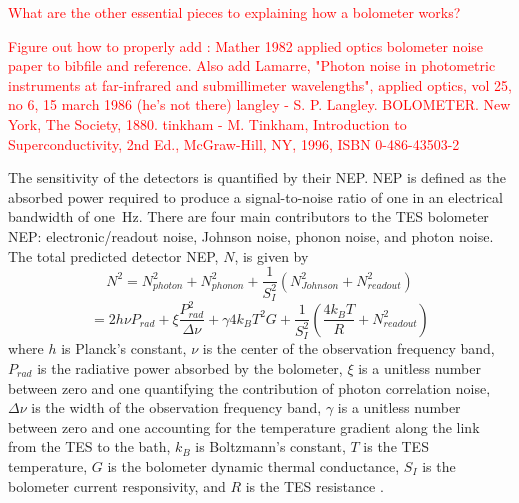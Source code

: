 
\textcolor{red}{What are the other essential pieces to explaining how a bolometer works?}


\textcolor{red}{Figure out how to properly add : 
Mather 1982 applied optics bolometer noise paper to bibfile and reference. 
Also add Lamarre, "Photon noise in photometric instruments at far-infrared and submillimeter wavelengths", applied optics, vol 25, no 6, 15 march 1986 (he's not there)
langley - S. P. Langley. BOLOMETER. New York, The Society, 1880.
tinkham - M. Tinkham, Introduction to Superconductivity, 2nd Ed., McGraw-Hill, NY, 1996, ISBN 0-486-43503-2
}


The sensitivity of the detectors is quantified by their \ac{NEP}. 
\ac{NEP} is defined as the absorbed power required to produce a signal-to-noise ratio of one in an electrical bandwidth of one~Hz. 
There are four main contributors to the \ac{TES} bolometer \ac{NEP}: electronic/readout noise, Johnson noise, phonon noise, and photon noise. 
The total predicted detector \ac{NEP}, $N$, is given by 
\begin{equation}
N^{2} = N_{photon}^2 + N_{phonon}^2 + \frac{1}{S_I^2} ( N_{Johnson}^2 + N_{readout}^2 )
\end{equation}
\begin{equation}
= 2h\nu P_{rad} + \xi \frac{P_{rad}^2}{\Delta \nu} + \gamma 4k_{B} T^2 G + \frac{1}{S_I^2} (\frac{4k_{B}T}{R} + N_{readout}^2 )
\label{eq:nep}
\end{equation}
where $h$ is Planck's constant, $\nu$ is the center of the observation frequency band, $P_{rad}$ is the radiative power absorbed by the bolometer, $\xi$ is a unitless number between zero and one quantifying the contribution of photon correlation noise, $\Delta \nu$ is the width of the observation frequency band, $\gamma$ is a unitless number between zero and one accounting for the temperature gradient along the link from the \ac{TES} to the bath, $k_{B}$ is Boltzmann's constant, $T$ is the \ac{TES} temperature, $G$ is the bolometer dynamic thermal conductance, $S_{I}$ is the bolometer current responsivity, and $R$ is the \ac{TES} resistance \citep{Mather1982a}. 

